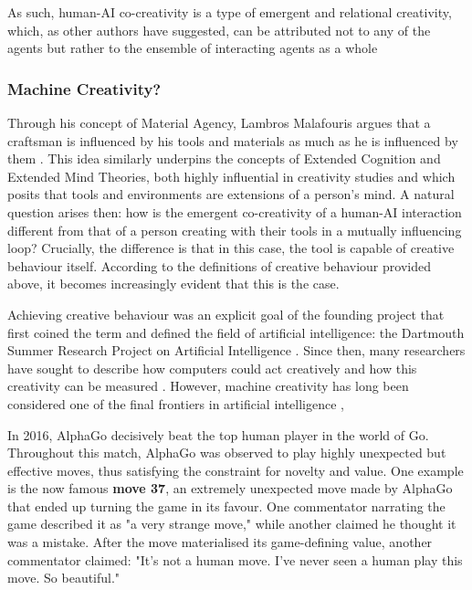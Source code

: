 As such, human-AI co-creativity is a type of emergent and relational creativity, which, as other authors have suggested, can be attributed not to any of the agents but rather to the ensemble of interacting agents as a whole \cite{Davis2013-jy, Rezwana2023-rt}

\subsubsection{Machine Creativity?}

Through his concept of Material Agency, Lambros Malafouris argues that a craftsman is influenced by his tools and materials as much as he is influenced by them \cite{Malafouris2013-by}. This idea similarly underpins the concepts of Extended Cognition and Extended Mind Theories, both highly influential in creativity studies and which posits that tools and environments are extensions of a person's mind. A natural question arises then: how is the emergent co-creativity of a human-AI interaction different from that of a person creating with their tools in a mutually influencing loop? Crucially, the difference is that in this case, the tool is capable of creative behaviour itself. According to the definitions of creative behaviour provided above, it becomes increasingly evident that this is the case. 

Achieving creative behaviour was an explicit goal of the founding project that first coined the term and defined the field of artificial intelligence: the Dartmouth Summer Research Project on Artificial Intelligence \cite{McCarthy1955-ls}. Since then,  many researchers have sought to describe how computers could act creatively and how this creativity can be measured \cite{Boden2003-hk, Boden1998-yn, Colton2012-jc, Bown2012-gg, Moruzzi2020-mw, Wiggins2006-zd, Jordanous2012-kw}. However, machine creativity has long been considered one of the final frontiers in artificial intelligence \cite{Colton2021-bt},

In 2016, AlphaGo decisively beat the top human player in the world of Go. Throughout this match, AlphaGo was observed to play highly unexpected but effective moves, thus satisfying the constraint for novelty and value. One example is the now famous \textbf{move 37}, an extremely unexpected move made by AlphaGo that ended up turning the game in its favour. One commentator narrating the game described it as "a very strange move," while another claimed he thought it was a mistake. After the move materialised its game-defining value, another commentator claimed: "It’s not a human move. I’ve never seen a human play this move. So beautiful."

